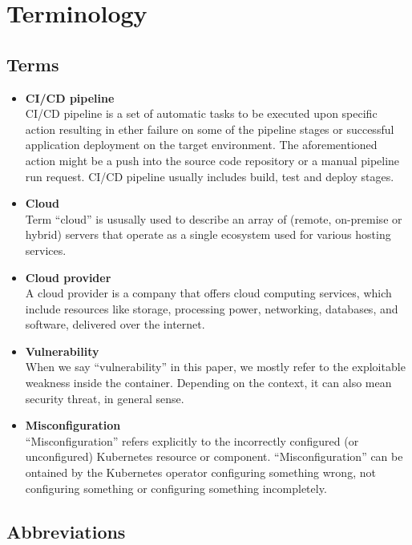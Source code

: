 \chapter*{Terminology}

\section*{Terms}

\begin{itemize}
    \setlength\itemsep{1px}
    \item \textbf{CI/CD pipeline} \\
    CI/CD pipeline is a set of automatic tasks to be executed upon specific action resulting in ether failure on some of the pipeline stages or successful application deployment on the target environment. The aforementioned action might be a push into the source code repository or a manual pipeline run request. CI/CD pipeline usually includes build, test and deploy stages.
    \item \textbf{Cloud} \\
    Term ``cloud'' is ususally used to describe an array of (remote, on-premise or hybrid) servers that operate as a single ecosystem used for various hosting services.
    \item \textbf{Cloud provider} \\
    A cloud provider is a company that offers cloud computing services, which include resources like storage, processing power, networking, databases, and software, delivered over the internet.
    \item \textbf{Vulnerability} \\
    When we say ``vulnerability'' in this paper, we mostly refer to the exploitable weakness inside the container. Depending on the context, it can also mean security threat, in general sense.
    \item \textbf{Misconfiguration} \\
    ``Misconfiguration'' refers explicitly to the incorrectly configured (or unconfigured) Kubernetes resource or component. ``Misconfiguration'' can be ontained by the Kubernetes operator configuring something wrong, not configuring something or configuring something incompletely.
\end{itemize}

\section*{Abbreviations}

